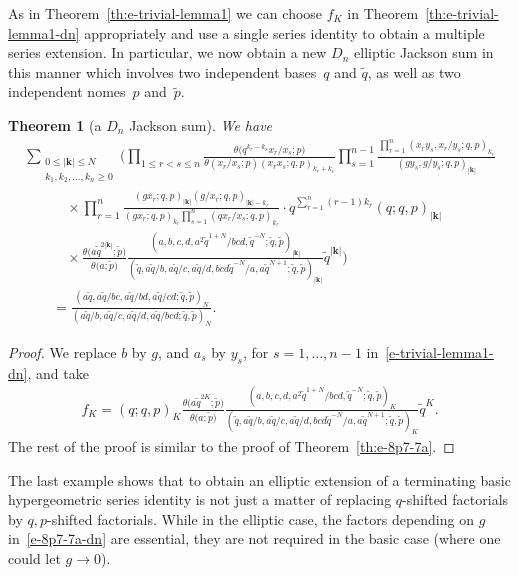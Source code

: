 \documentclass[pdftex]{sigma}
\numberwithin{equation}{section}
\newtheorem{Theorem}{Theorem}[section]
\newcommand\sumk{{\left| \boldsymbol{k} \right|}}
\newcommand{\smallprod}[1]{\prod\limits_{r =1}^{#1}} %
\begin{document}
As in Theorem~\ref{th:e-trivial-lemma1} we can choose $f_K$ in Theorem~\ref{th:e-trivial-lemma1-dn} appropriately and use a single series identity to obtain a multiple series extension. In particular, we now obtain a new $D_n$ elliptic Jackson sum in this manner which involves two independent bases~$q$ and $\tilde{q}$, as well as two independent nomes~$p$ and~$\tilde{p}$.
\begin{Theorem}[a $D_n$ Jackson sum]\label{th:e-8p7-7a-dn} We have
\begin{gather}
\sum\limits_{\substack{0\leq \sumk \leq N \\ k_1,k_2, \dots, k_n\geq 0} }
\Bigg(
\prod_{1\le r<s\le n}\frac{\theta\big(q^{k_r-k_s}x_r/x_s;p\big)}
{\theta(x_r/x_s;p)(x_rx_s;q,p)_{k_r+k_s}}\prod_{s=1}^{n-1}\frac{
\prod\limits_{r=1}^n(x_ry_s,x_r/y_s;q,p)_{k_r}}
{(gy_s,g/y_s;q,p)_{\sumk}}\nonumber\\
\qquad\quad{} \times \smallprod n\frac{(gx_r;q,p)_{\sumk}(g/x_r;q,p)_{\sumk-k_r}} {(gx_r;q,p)_{k_r}\prod\limits_{s=1}^n(qx_r/x_s;q,p)_{k_r}}\cdot
q^{\sum\limits_{r=1}^n(r-1)k_r} (q;q,p)_\sumk\nonumber\\
\qquad\quad{} \times \frac{\theta\big(a\tilde{q}^{2\sumk};\tilde{p}\big)}{\theta\big(a;\tilde{p}\big)}
\frac{(a, b, c, d, a^2\tilde{q}^{1+N}/b c d,\tilde{q}^{-N};\tilde{q},\tilde{p})_\sumk}{(\tilde{q},a\tilde{q}/b, a\tilde{q}/c,
a\tilde{q}/d, b c d\tilde{q}^{-N}/a,a\tilde{q}^{N+1};\tilde{q},\tilde{p})_\sumk} \tilde{q}^{\sumk}\Bigg)\nonumber\\
 \qquad{} = \frac{(a\tilde{q}, a\tilde{q}/bc, a\tilde{q}/bd, a\tilde{q}/cd;\tilde{q},\tilde{p})_N}
{(a\tilde{q}/b, a\tilde{q}/c, a\tilde{q}/d, a\tilde{q}/b c d;\tilde{q},\tilde{p})_N}.\label{e-8p7-7a-dn}
\end{gather}
\end{Theorem}
\begin{proof}We replace $b$ by $g$, and $a_s$ by $y_s$, for $s=1,\dots,n-1$ in~\eqref{e-trivial-lemma1-dn}, and take
\begin{gather*}f_K=(q;q,p)_K
\frac{\theta\big(a\tilde{q}^{2K};\tilde{p}\big)}{\theta\big(a;\tilde{p}\big)}
\frac{( a, b, c, d, a^2\tilde{q}^{1+N}/b c d,\tilde{q}^{-N};
\tilde{q},\tilde{p})_K}{(\tilde{q},a\tilde{q}/b, a\tilde{q}/c,
a\tilde{q}/d, b c d\tilde{q}^{-N}/a,a\tilde{q}^{N+1};\tilde{q},\tilde{p})_K} \tilde{q}^{K}.
\end{gather*}
The rest of the proof is similar to the proof of Theorem~\ref{th:e-8p7-7a}.
\end{proof}

The last example shows that to obtain an elliptic extension of a terminating basic hypergeometric series identity is not just a matter of replacing $q$-shifted factorials by $q,p$-shifted factorials. While in the elliptic case, the factors depending on $g$ in~\eqref{e-8p7-7a-dn} are essential, they are not required in the basic case (where one could let $g\to0$).
\end{document}
